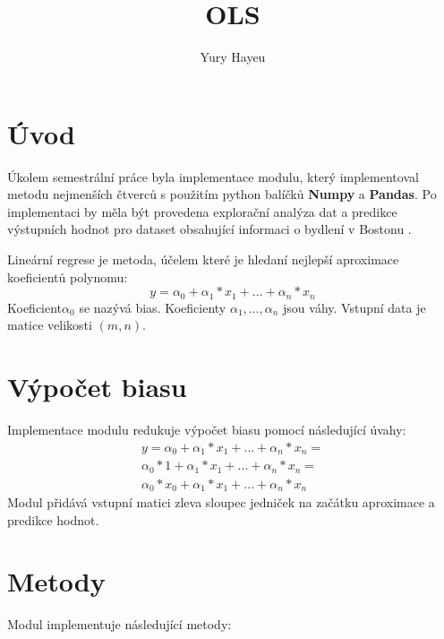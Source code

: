 \documentclass[czech]{pyt-report}
\title{OLS}
\author{Yury Hayeu}
\affiliation{ČVUT--FIT}
\begin{document}
\maketitle


\section{Úvod}
Úkolem semestrální práce byla implementace modulu, který implementoval metodu nejmenších čtverců s použitím python balíčků \textbf{Numpy} a \textbf{Pandas}.
Po implementaci by měla být provedena explorační analýza dat a predikce výstupních hodnot pro dataset obsahující informaci o bydlení v Bostonu \cite{housing}.

Lineární regrese je metoda, účelem které je hledaní nejlepší aproximace koeficientů polynomu:
\begin{equation}
y = \alpha_0 + \alpha_1 * x_1 + ... + \alpha_n * x_n
\end{equation}
Koeficient$\alpha_0$ se nazývá bias. Koeficienty $\alpha_1 , ... , \alpha_n$ jsou váhy. Vstupní data je matice velikosti $(m, n)$.
\section{Výpočet biasu}
Implementace modulu redukuje výpočet biasu pomocí následující úvahy:
\begin{multline*}
y = \alpha_0 + \alpha_1 * x_1 + ... + \alpha_n * x_n =\\
  \alpha_0 * 1 + \alpha_1 * x_1 + ... + \alpha_n * x_n = \\
  \alpha_0 * x_0 + \alpha_1 * x_1 + ... + \alpha_n * x_n
\end{multline*}
Modul přidává vstupní matici zleva sloupec jedniček na začátku aproximace a predikce hodnot.
\section{Metody}
Modul implementuje následující metody:
\end{document}
